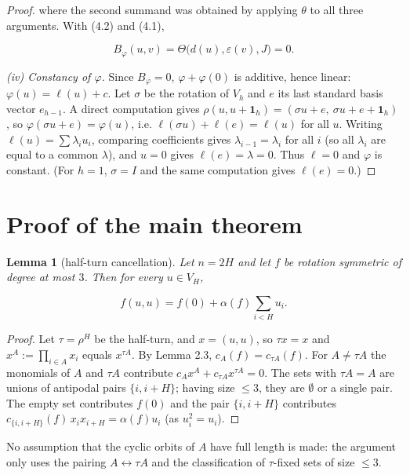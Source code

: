 \documentclass[11pt,reqno]{amsart}
\newtheorem{lemma}{Lemma}[section]
\begin{document}
\begin{proof}
where the second summand was obtained by applying $\theta$ to all three arguments. With (4.2) and (4.1),

\begin{equation*}B_\varphi(u,v)=\Theta\big(d(u),\varepsilon(v),J\big)=0.\end{equation*}


\emph{(iv) Constancy of $\varphi$.} Since $B_\varphi=0$, $\varphi+\varphi(0)$ is additive, hence linear: $\varphi(u)=\ell(u)+c$. Let $\sigma$ be the rotation of $V_h$ and $e$ its last standard basis vector $e_{h-1}$. A direct computation gives $\rho(u,u+\mathbf 1_h)=(\sigma u+e,\ \sigma u+e+\mathbf 1_h)$, so $\varphi(\sigma u+e)=\varphi(u)$, i.e. $\ell(\sigma u)+\ell(e)=\ell(u)$ for all $u$. Writing $\ell(u)=\sum\lambda_iu_i$, comparing coefficients gives $\lambda_{i-1}=\lambda_i$ for all $i$ (so all $\lambda_i$ are equal to a common $\lambda$), and $u=0$ gives $\ell(e)=\lambda=0$. Thus $\ell=0$ and $\varphi$ is constant. (For $h=1$, $\sigma=I$ and the same computation gives $\ell(e)=0$.)
\end{proof}


\section{Proof of the main theorem}

\begin{lemma}[half-turn cancellation]
Let $n=2H$ and let $f$ be rotation symmetric of degree at most $3$. Then for every $u\in V_H$,

\begin{equation*}f(u,u)=f(0)+\alpha(f)\sum_{i<H}u_i. \tag{5.1}\end{equation*}


\end{lemma}
\begin{proof}
Let $\tau=\rho^H$ be the half-turn, and $x=(u,u)$, so $\tau x=x$ and $x^A:=\prod_{i\in A}x_i$ equals $x^{\tau A}$. By Lemma 2.3, $c_A(f)=c_{\tau A}(f)$. For $A\ne\tau A$ the monomials of $A$ and $\tau A$ contribute $c_Ax^A+c_{\tau A}x^{\tau A}=0$. The sets with $\tau A=A$ are unions of antipodal pairs $\{i,i+H\}$; having size $\le3$, they are $\emptyset$ or a single pair. The empty set contributes $f(0)$ and the pair $\{i,i+H\}$ contributes $c_{\{i,i+H\}}(f)\,x_ix_{i+H}=\alpha(f)u_i$ (as $u_i^2=u_i$).
\end{proof}

No assumption that the cyclic orbits of $A$ have full length is made: the argument only uses the pairing $A\leftrightarrow\tau A$ and the classification of $\tau$-fixed sets of size $\le3$.
\end{document}
